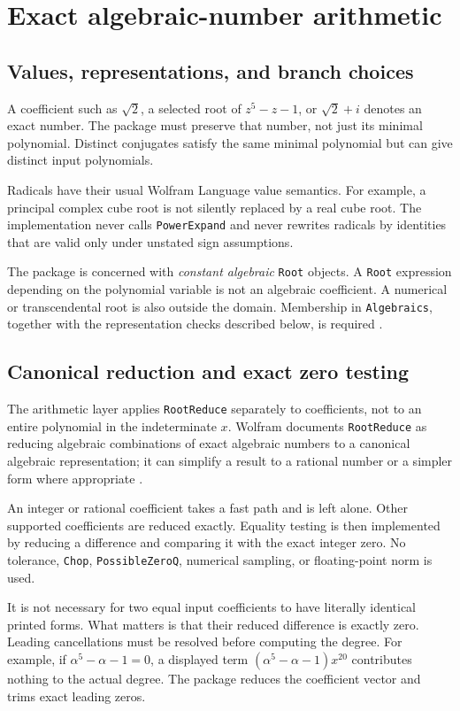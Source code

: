 \documentclass[11pt,letterpaper]{article}
\theoremstyle{definition}
\theoremstyle{remark}
\newcommand{\wt}[1]{\texttt{#1}}
\begin{document}
\section{Exact algebraic-number arithmetic}
\label{sec:arithmetic}

\subsection{Values, representations, and branch choices}
A coefficient such as $\sqrt2$, a selected root of $z^5-z-1$, or
$\sqrt2+i$ denotes an exact number. The package must preserve that
number, not just its minimal polynomial. Distinct conjugates satisfy the
same minimal polynomial but can give distinct input polynomials.

Radicals have their usual Wolfram Language value semantics. For
example, a principal complex cube root is not silently replaced by a
real cube root. The implementation never calls \wt{PowerExpand} and
never rewrites radicals by identities that are valid only under unstated
sign assumptions.

The package is concerned with \emph{constant algebraic} \wt{Root}
objects. A \wt{Root} expression depending on the polynomial variable is
not an algebraic coefficient. A numerical or transcendental root is also
outside the domain. Membership in \wt{Algebraics}, together with the
representation checks described below, is required \cite{wl-algebraics}.

\subsection{Canonical reduction and exact zero testing}
The arithmetic layer applies \wt{RootReduce} separately to coefficients,
not to an entire polynomial in the indeterminate $x$. Wolfram documents
\wt{RootReduce} as reducing algebraic combinations of exact algebraic
numbers to a canonical algebraic representation; it can simplify a result
to a rational number or a simpler form where appropriate
\cite{wl-rootreduce}.

An integer or rational coefficient takes a fast path and is left alone.
Other supported coefficients are reduced exactly. Equality testing is
then implemented by reducing a difference and comparing it with the
exact integer zero. No tolerance, \wt{Chop}, \wt{PossibleZeroQ}, numerical
sampling, or floating-point norm is used.

It is not necessary for two equal input coefficients to have literally
identical printed forms. What matters is that their reduced difference
is exactly zero. Leading cancellations must be resolved before computing
the degree. For example, if $\alpha^5-\alpha-1=0$, a displayed term
$(\alpha^5-\alpha-1)x^{20}$ contributes nothing to the actual degree.
The package reduces the coefficient vector and trims exact leading zeros.
\end{document}
